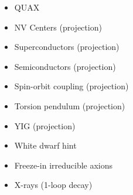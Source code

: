 \documentclass[8pt,twocolumn]{extarticle}
\begin{document}
\begin{mdframed}
\begin{itemize}
    \item QUAX~\cite{Crescini:2018qrz,QUAX:2020adt}
    	\item NV Centers (projection)~\cite{Chigusa:2023hms}
    	\item Superconductors (projection)~\cite{Hochberg:2016ajh}
  	\item Semiconductors (projection)~\cite{Hochberg:2016sqx}
  	\item Spin-orbit coupling (projection)~\cite{Chen:2022pyd}
  	\item Torsion pendulum (projection)~\cite{Graham:2017ivz}
  	  	\item YIG (projection)~\cite{Chigusa:2020gfs}
  	\item White dwarf hint~\cite{Giannotti:2017hny}
  	\item Freeze-in irreducible axions~\cite{Langhoff:2022bij}
  	\item X-rays (1-loop decay)~\cite{Ferreira:2022egk}
\end{itemize}
\end{mdframed}
\end{document}
